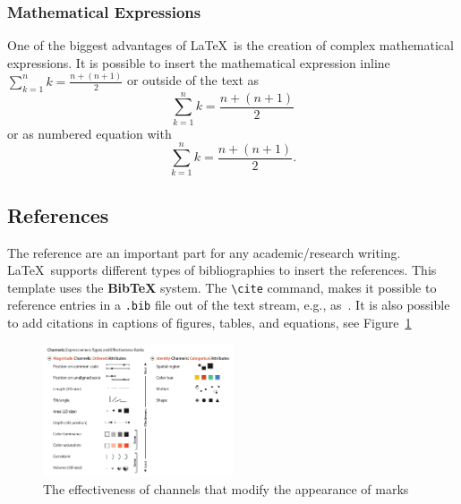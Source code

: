\documentclass[11pt,a4paper]{article} %
\begin{document}
\subsubsection{Mathematical Expressions}
One of the biggest advantages of \LaTeX\ is the creation of complex mathematical expressions. It is possible to insert the mathematical expression inline $\sum_{k=1}^{n} {k} = \frac{n+(n+1)}{2}$ or outside of the text as \[ \sum_{k=1}^{n} {k} = \frac{n+(n+1)}{2} \] or as numbered equation with
\begin{equation}
\sum_{k=1}^{n} {k} = \frac{n+(n+1)}{2}.
\end{equation}


\subsection{References}
The reference are an important part for any academic/research writing. \LaTeX\ supports different types of bibliographies to insert the references. This template uses the \textbf{BibTeX} system.
The \verb|\cite| command, makes it possible to reference entries in a \verb|.bib| file out of the text stream, e.g., as~\cite{2019_bioinformatics_ordino}.
It is also possible to add citations in captions of figures, tables, and equations, see Figure~\ref{fig:munzner_channels}
\begin{figure}[!htb]
    \centering
    \includegraphics[width=0.5\textwidth]{img/Munzner_Channels.png}
    \caption{The effectiveness of channels that modify the appearance of marks~\cite{munzner_visualization_2014}}
    \label{fig:munzner_channels}
\end{figure}






\end{document}
